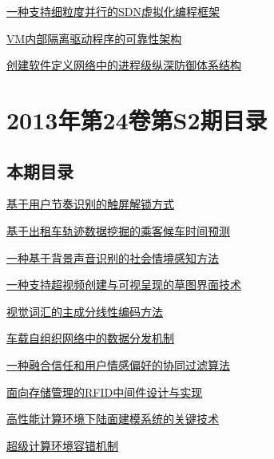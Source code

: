 \documentclass[a4paper]{article}
\begin{document}
\href{http://www.jos.org.cn/ch/reader/download_pdf.aspx?file_no=4679&year_id=2014&quarter_id=10&falg=1}{一种支持细粒度并行的SDN虚拟化编程框架}

\href{http://www.jos.org.cn/ch/reader/download_pdf.aspx?file_no=4678&year_id=2014&quarter_id=10&falg=1}{VM内部隔离驱动程序的可靠性架构}

\href{http://www.jos.org.cn/ch/reader/download_pdf.aspx?file_no=4682&year_id=2014&quarter_id=10&falg=1}{创建软件定义网络中的进程级纵深防御体系结构}


\section{\textbf{2013年第24卷第S2期目录}}
\subsection{本期目录}
\href{http://www.jos.org.cn/ch/reader/download_pdf.aspx?file_no=13018&year_id=2013&quarter_id=S2&falg=1}{基于用户节奏识别的触屏解锁方式}

\href{http://www.jos.org.cn/ch/reader/download_pdf.aspx?file_no=13019&year_id=2013&quarter_id=S2&falg=1}{基于出租车轨迹数据挖掘的乘客候车时间预测}

\href{http://www.jos.org.cn/ch/reader/download_pdf.aspx?file_no=13020&year_id=2013&quarter_id=S2&falg=1}{一种基于背景声音识别的社会情境感知方法}

\href{http://www.jos.org.cn/ch/reader/download_pdf.aspx?file_no=13021&year_id=2013&quarter_id=S2&falg=1}{一种支持超视频创建与可视呈现的草图界面技术}

\href{http://www.jos.org.cn/ch/reader/download_pdf.aspx?file_no=13022&year_id=2013&quarter_id=S2&falg=1}{视觉词汇的主成分线性编码方法}

\href{http://www.jos.org.cn/ch/reader/download_pdf.aspx?file_no=13023&year_id=2013&quarter_id=S2&falg=1}{车载自组织网络中的数据分发机制}

\href{http://www.jos.org.cn/ch/reader/download_pdf.aspx?file_no=13024&year_id=2013&quarter_id=S2&falg=1}{一种融合信任和用户情感偏好的协同过滤算法}

\href{http://www.jos.org.cn/ch/reader/download_pdf.aspx?file_no=13025&year_id=2013&quarter_id=S2&falg=1}{面向存储管理的RFID中间件设计与实现}

\href{http://www.jos.org.cn/ch/reader/download_pdf.aspx?file_no=13026&year_id=2013&quarter_id=S2&falg=1}{高性能计算环境下陆面建模系统的关键技术}

\href{http://www.jos.org.cn/ch/reader/download_pdf.aspx?file_no=13027&year_id=2013&quarter_id=S2&falg=1}{超级计算环境容错机制}
\end{document}
